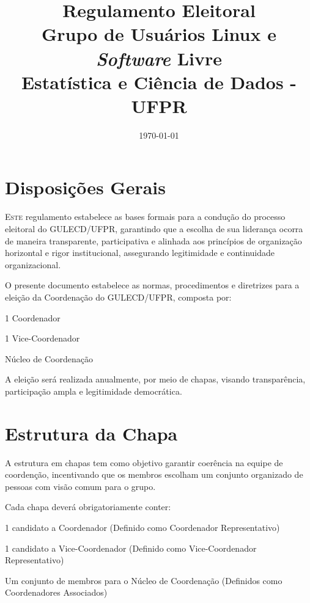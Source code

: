 \documentclass[
  12pt,          %
  a4paper,       %
  oneside,       %
  brazil         %
]{article}
\title{Regulamento Eleitoral\\[0.3em]
  \Large\mdseries\color{gulecdGray}%
  Grupo de Usuários Linux e \textit{Software} Livre\\Estatística e Ciência de Dados - UFPR}
\date{\today}
\begin{document}
\thispagestyle{empty}
\maketitle

\newpage

\section{Disposições Gerais}

\lettrine[lines=3, lhang=0.1, nindent=0em, slope=-0.5em]{E}{ste} regulamento estabelece as bases formais para a condução do processo eleitoral do GULECD/UFPR,
 garantindo que a escolha de sua liderança ocorra de maneira transparente, participativa e alinhada aos princípios de organização horizontal e rigor institucional, 
 assegurando legitimidade e continuidade organizacional.

O presente documento estabelece as normas, procedimentos e diretrizes para a eleição da Coordenação do GULECD/UFPR, composta por:

\begin{conduta}
	\item 1 Coordenador
	\item 1 Vice-Coordenador
	\item Núcleo de Coordenação
\end{conduta}

A eleição será realizada anualmente, por meio de chapas, visando transparência, participação ampla e legitimidade democrática.

\section{Estrutura da Chapa}

A estrutura em chapas tem como objetivo garantir coerência na equipe de coordenção, incentivando que os membros escolham um conjunto 
organizado de pessoas com visão comum para o grupo. 

Cada chapa deverá obrigatoriamente conter:

\begin{conduta}
	\item 1 candidato a Coordenador (Definido como Coordenador Representativo)
	\item 1 candidato a Vice-Coordenador (Definido como Vice-Coordenador Representativo)
	\item Um conjunto de membros para o Núcleo de Coordenação (Definidos como Coordenadores Associados)
\end{conduta}
\end{document}
